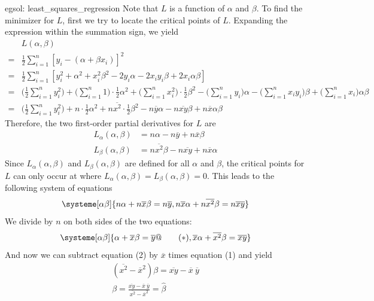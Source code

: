 \begin{egsol}[]{egsol: least_squares_regression}
    Note that $L$ is a function of $\alpha$ and $\beta$.  To find the minimizer for $L$, first we try to locate the critical points of $L$.  Expanding the expression within the summation sign, we yield
    \begin{align*}
        &L(\alpha, \beta)\\
        = &\frac{1}{2} \sum_{i=1}^n[y_i - (\alpha + \beta x_i)]^2\\
        = &\frac{1}{2} \sum_{i=1}^n[y_i^2 + \alpha^2 + x_i^2 \beta^2 - 2 y_i \alpha - 2 x_i y_i \beta  +2 x_i \alpha \beta]\\
        = &\Big(\frac{1}{2} \sum_{i=1}^n y_i^2\Big) + \Big(\sum_{i=1}^n 1\Big) \cdot \frac{1}{2} \alpha^2 + \Big(\sum_{i=1}^n x_i^2\Big) \cdot \frac{1}{2}\beta^2 - \Big(\sum_{i=1}^n y_i\Big) \alpha - \Big(\sum_{i=1}^n x_i y_i\Big) \beta + \Big(\sum_{i=1}^n x_i\Big) \alpha \beta\\
        = &\Big(\frac{1}{2} \sum_{i=1}^n y_i^2\Big) + n \cdot \frac{1}{2} \alpha^2 + n \overline{x^2} \cdot \frac{1}{2}\beta^2 - n \overline{y} \alpha - n \overline{xy} \beta + n \overline{x} \alpha \beta
    \end{align*}
    Therefore, the two first-order partial derivatives for $L$ are
    \begin{align*}
        L_\alpha(\alpha, \beta) &= n \alpha - n \overline{y} + n \overline{x} \beta\\
        L_\beta(\alpha, \beta) &= n\overline{x^2} \beta - n \overline{xy} + n \overline{x} \alpha
    \end{align*}
    Since $L_\alpha(\alpha, \beta)$ and $L_\beta(\alpha, \beta)$ are defined for all $\alpha$ and $\beta$, the critical points for $L$ can only occur at where $L_\alpha(\alpha, \beta) = L_\beta(\alpha, \beta) = 0$.  This leads to the following system of equations
    \[\systeme[\alpha\beta]{n\alpha+n\overline{x}\beta=n\overline{y}, n\overline{x}\alpha + n\overline{x^2}\beta = n\overline{xy}}\]
    We divide by $n$ on both sides of the two equations:
    \[\systeme[\alpha\beta]{\alpha+\overline{x}\beta=\overline{y}@\qquad(*), \overline{x}\alpha + \overline{x^2}\beta = \overline{xy}}\]
    And now we can subtract equation (2) by $\overline{x}$ times equation (1) and yield
    \begin{align*}
        (\overline{x^2} - \overline{x}^2)\beta = \overline{xy} - \overline{x} ~ \overline{y}\\
        \beta = \frac{\overline{xy} - \overline{x} ~ \overline{y}}{\overline{x^2} - \overline{x}^2} = \hat{\beta}

\end{align*}
\end{egsol}
